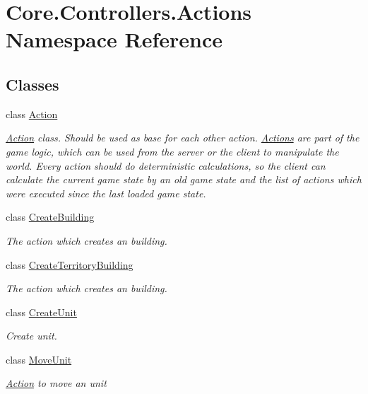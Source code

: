 \hypertarget{namespaceCore_1_1Controllers_1_1Actions}{}\section{Core.\+Controllers.\+Actions Namespace Reference}
\label{namespaceCore_1_1Controllers_1_1Actions}
\subsection*{Classes}
\begin{DoxyCompactItemize}
\item 
class \hyperlink{classCore_1_1Controllers_1_1Actions_1_1Action}{Action}
\begin{DoxyCompactList}\small\item\em \hyperlink{classCore_1_1Controllers_1_1Actions_1_1Action}{Action} class. Should be used as base for each other action. \hyperlink{namespaceCore_1_1Controllers_1_1Actions}{Actions} are part of the game logic, which can be used from the server or the client to manipulate the world. Every action should do deterministic calculations, so the client can calculate the current game state by an old game state and the list of actions which were executed since the last loaded game state. \end{DoxyCompactList}\item 
class \hyperlink{classCore_1_1Controllers_1_1Actions_1_1CreateBuilding}{Create\+Building}
\begin{DoxyCompactList}\small\item\em The action which creates an building. \end{DoxyCompactList}\item 
class \hyperlink{classCore_1_1Controllers_1_1Actions_1_1CreateTerritoryBuilding}{Create\+Territory\+Building}
\begin{DoxyCompactList}\small\item\em The action which creates an building. \end{DoxyCompactList}\item 
class \hyperlink{classCore_1_1Controllers_1_1Actions_1_1CreateUnit}{Create\+Unit}
\begin{DoxyCompactList}\small\item\em Create unit. \end{DoxyCompactList}\item 
class \hyperlink{classCore_1_1Controllers_1_1Actions_1_1MoveUnit}{Move\+Unit}
\begin{DoxyCompactList}\small\item\em \hyperlink{classCore_1_1Controllers_1_1Actions_1_1Action}{Action} to move an unit \end{DoxyCompactList}\end{DoxyCompactItemize}
